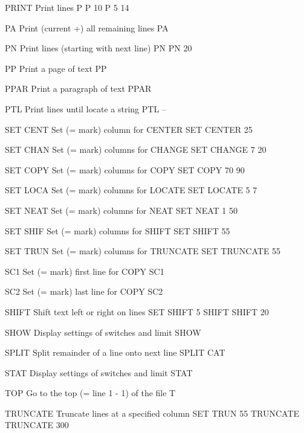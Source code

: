 PRINT     Print lines                                 P
                                                      P 10
                                                      P 5 14
 
PA        Print (current +) all remaining lines       PA
 
PN        Print lines (starting with next line)       PN
                                                      PN 20
 
PP        Print a page of text                        PP
 
PPAR      Print a paragraph of text                   PPAR
 
PTL       Print lines until locate a string           PTL --
 
SET CENT  Set (= mark) column for CENTER              SET CENTER 25
 
SET CHAN  Set (= mark) columns for CHANGE             SET CHANGE 7 20
 
SET COPY  Set (= mark) columns for COPY               SET COPY 70 90
 
SET LOCA  Set (= mark) columns for LOCATE             SET LOCATE 5 7
 
SET NEAT  Set (= mark) columns for NEAT               SET NEAT 1 50
 
SET SHIF  Set (= mark) columns for SHIFT              SET SHIFT 55
 
SET TRUN  Set (= mark) columns for TRUNCATE           SET TRUNCATE 55
 
SC1       Set (= mark) first line for COPY            SC1
 
SC2       Set (= mark) last  line for COPY            SC2
 
SHIFT     Shift text left or right on lines           SET SHIFT 5
                                                      SHIFT
                                                      SHIFT 20
 
SHOW      Display settings of switches and limit      SHOW
 
SPLIT     Split remainder of a line onto next line    SPLIT CAT
 
STAT      Display settings of switches and limit      STAT
 
TOP       Go to the top (= line 1 - 1) of the file    T
 
TRUNCATE  Truncate lines at a specified column        SET TRUN 55
                                                      TRUNCATE
                                                      TRUNCATE 300
 
